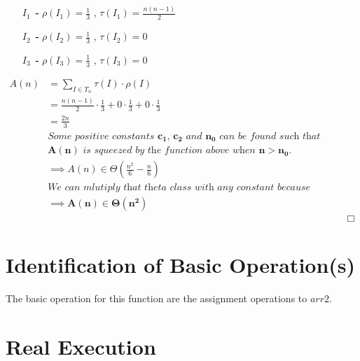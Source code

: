 \documentclass[10pt]{article}
\begin{document}
\begin{enumerate}[leftmargin=2.6cm]
    \item[\textit{\textbf{$I_{1}$ - }}] $\rho (\mathit{I_{1}}) = \frac{1}{3}$ ,  $\tau (\mathit{I_{1}})= \frac{n(n-1)}{2}$
    \item[\textit{\textbf{$I_{2}$ - }}] $\rho (\mathit{I_{2}}) = \frac{1}{3}$ ,  $\tau (\mathit{I_{2}}) = 0$
    \item[\textit{\textbf{$I_{3}$ - }}] $\rho (\mathit{I_{3}}) = \frac{1}{3}$ ,  $\tau (\mathit{I_{3}}) = 0$
\end{enumerate}
\begin{align*}
A(n) &= \displaystyle\sum _{I \in T_{n}} \tau (I) \cdot \rho (I) &&\\
 &= \frac{n(n-1)}{2} \cdot \frac{1}{3} + 0\cdot \frac{1}{3}+ 0 \cdot \frac {1}{3}&& \\
 &= \frac{2n}{3}&& \\ 
 &\textit{Some positive constants $\mathbf{c_{1}}$, $\mathbf{c_{2}}$ and $\mathbf{n_{0}}$ can be found such that} && \\ 
 &\textit{$\mathbf{A(n)}$ is squeezed by the function above when $\mathbf{n > n_{0}}$.} && \\
 &\implies A(n) \in \Theta (\frac{n^2}{6}- \frac{n}{6}) && \\
 &\textit{We can mlutiply that theta class with any constant because theta class is unvariant under scaling. Also we can ignore low order terms.} && \\
 &\implies \mathbf{A(n) \boldsymbol{\in} \Theta (n^2)} && \\
 & &&\Box
\end{align*}

\section{Identification of Basic Operation(s)}
The basic operation for this function are the assignment operations to $arr2$. 

\newpage
\section{Real Execution}
\end{document}
